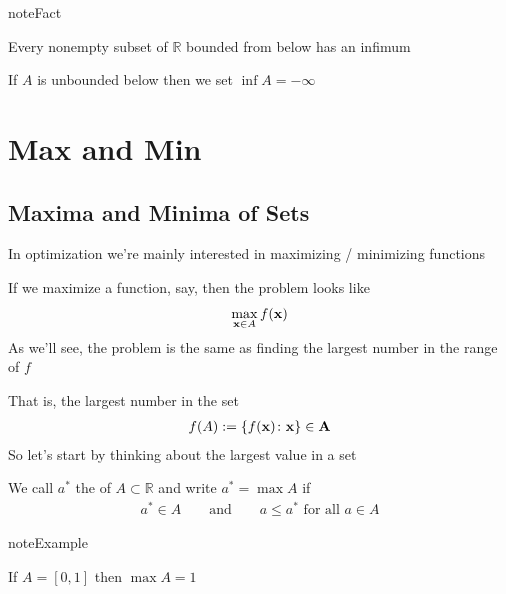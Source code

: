 \documentclass[letterpaper,10pt,english]{jupyterBook}
\begin{document}
\begin{sphinxadmonition}{note}{Fact}

\sphinxAtStartPar
Every nonempty subset of \(\mathbb{R}\) bounded from below has an infimum
\end{sphinxadmonition}

\sphinxAtStartPar
If \(A\) is unbounded below then we set \(\inf A = -\infty\)


\section{Max and Min}
\label{\detokenize{06.optimization_fundamentals:max-and-min}}

\subsection{Maxima and Minima of Sets}
\label{\detokenize{06.optimization_fundamentals:maxima-and-minima-of-sets}}
\sphinxAtStartPar
In optimization we’re mainly interested in maximizing / minimizing
functions

\sphinxAtStartPar
If we maximize a function, say, then the problem looks like
\begin{equation*}
\begin{split}
%
\max_{{\bf x} \in A} f({\bf x})
%
\end{split}
\end{equation*}
\sphinxAtStartPar
As we’ll see, the problem is the same as finding the largest number in the range of \(f\)

\sphinxAtStartPar
That is, the largest number in the set
\begin{equation*}
\begin{split}
%
f(A) := \{ f({\bf x}) \colon {\bf x \} \in A}
%
\end{split}
\end{equation*}
\sphinxAtStartPar
So let’s start by thinking about the largest value in a set

\sphinxAtStartPar
We call \(a^*\) the  of \(A \subset \mathbb{R}\) and write \(a^* = \max A\) if
\begin{equation*}
\begin{split}
%
a^* \in A 
\qquad \text{and} \qquad
a \leq a^*
\text{ for all } 
a \in A 
%
\end{split}
\end{equation*}
\begin{sphinxadmonition}{note}{Example}

\sphinxAtStartPar
If \(A = [0, 1]\) then \(\max A = 1\)
\end{sphinxadmonition}
\end{document}
